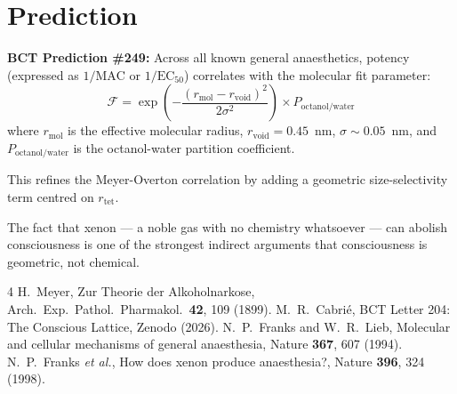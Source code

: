 \documentclass[aps,prl,twocolumn,superscriptaddress]{revtex4-2}
\begin{document}
\section{Prediction}

\textbf{BCT Prediction \#249:} Across all known general anaesthetics, potency (expressed as $1/\mathrm{MAC}$ or $1/\mathrm{EC}_{50}$) correlates with the molecular fit parameter:
\begin{equation}
\mathcal{F} = \exp\left(-\frac{(r_{\mathrm{mol}} - r_{\mathrm{void}})^2}{2\sigma^2}\right) \times P_{\mathrm{octanol/water}}
\end{equation}
where $r_{\mathrm{mol}}$ is the effective molecular radius, $r_{\mathrm{void}} = 0.45$~nm, $\sigma \sim 0.05$~nm, and $P_{\mathrm{octanol/water}}$ is the octanol-water partition coefficient.

This refines the Meyer-Overton correlation by adding a geometric size-selectivity term centred on $r_{\mathrm{tet}}$.

\begin{acknowledgments}
The fact that xenon --- a noble gas with no chemistry whatsoever --- can abolish consciousness is one of the strongest indirect arguments that consciousness is geometric, not chemical.
\end{acknowledgments}

\begin{thebibliography}{4}
 H.~Meyer, Zur Theorie der Alkoholnarkose, Arch.\ Exp.\ Pathol.\ Pharmakol.\ \textbf{42}, 109 (1899).
 M.~R.~Cabri\'e, BCT Letter 204: The Conscious Lattice, Zenodo (2026).
 N.~P.~Franks and W.~R.~Lieb, Molecular and cellular mechanisms of general anaesthesia, Nature \textbf{367}, 607 (1994).
 N.~P.~Franks \emph{et al.}, How does xenon produce anaesthesia?, Nature \textbf{396}, 324 (1998).
\end{thebibliography}
\end{document}
